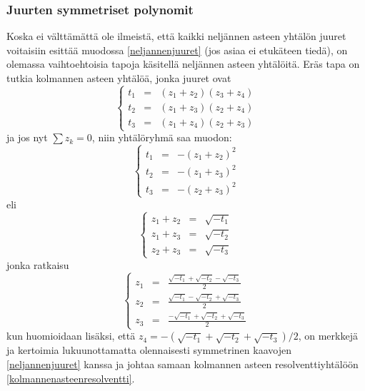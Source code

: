 \documentclass[a4paper,12pt,twoside]{article}
\begin{document}
\subsubsection{Juurten symmetriset polynomit}
Koska ei välttämättä ole ilmeistä, että kaikki neljännen asteen yhtälön juuret voitaisiin esittää muodossa \ref{neljannenjuuret} (jos asiaa ei etukäteen tiedä), on olemassa vaihtoehtoisia tapoja käsitellä neljännen asteen yhtälöitä. Eräs tapa on tutkia kolmannen asteen yhtälöä, jonka juuret ovat
$$
\left\{
\begin{array}{ccc}
  t_1 & = & (z_1+z_2)(z_3+z_4) \\
  t_2 & = & (z_1+z_3)(z_2+z_4) \\
  t_3 & = & (z_1+z_4)(z_2+z_3)
\end{array}
\right.
$$
ja jos nyt $\sum z_k=0$, niin yhtälöryhmä saa muodon:
$$
\left\{
\begin{array}{ccc}
  t_1 & = & -(z_1+z_2)^2 \\
  t_2 & = & -(z_1+z_3)^2 \\
  t_3 & = & -(z_2+z_3)^2
\end{array}
\right.
$$
eli
$$
\left\{
\begin{array}{ccc}
  z_1+z_2 & = & \sqrt{-t_1} \\
  z_1+z_3 & = & \sqrt{-t_2} \\
  z_2+z_3 & = & \sqrt{-t_3}
\end{array}
\right.
$$
jonka ratkaisu
$$
\left\{
\begin{array}{ccc}
  z_1 & = & \frac{\sqrt{-t_1}+\sqrt{-t_2}-\sqrt{-t_3}}{2} \\
  z_2 & = & \frac{\sqrt{-t_1}-\sqrt{-t_2}+\sqrt{-t_3}}{2} \\
  z_3 & = & \frac{-\sqrt{-t_1}+\sqrt{-t_2}+\sqrt{-t_3}}{2}
\end{array}
\right.
$$
kun huomioidaan lisäksi, että $z_4=-(\sqrt{-t_1}+\sqrt{-t_2}+\sqrt{-t_3})/2$, on merkkejä ja kertoimia lukuunottamatta olennaisesti symmetrinen kaavojen \ref{neljannenjuuret} kanssa ja johtaa samaan kolmannen asteen resolventtiyhtälöön \ref{kolmannenasteenresolventti}.
\end{document}

